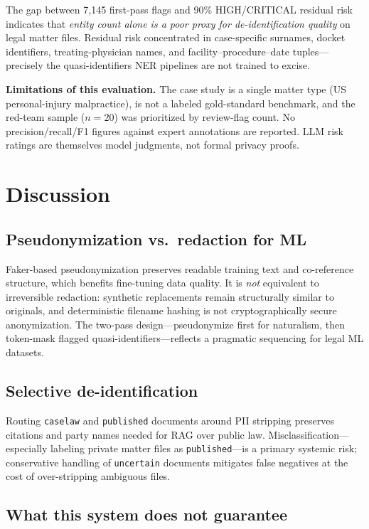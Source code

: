 \documentclass[11pt,a4paper]{article}
\begin{document}
The gap between 7{,}145 first-pass flags and 90\% HIGH/CRITICAL residual risk indicates that \emph{entity count alone is a poor proxy for de-identification quality} on legal matter files. Residual risk concentrated in case-specific surnames, docket identifiers, treating-physician names, and facility--procedure--date tuples---precisely the quasi-identifiers NER pipelines are not trained to excise.

\textbf{Limitations of this evaluation.} The case study is a single matter type (US personal-injury malpractice), is not a labeled gold-standard benchmark, and the red-team sample ($n=20$) was prioritized by review-flag count. No precision/recall/F1 figures against expert annotations are reported. LLM risk ratings are themselves model judgments, not formal privacy proofs.

\section{Discussion}

\subsection{Pseudonymization vs.\ redaction for ML}

Faker-based pseudonymization preserves readable training text and co-reference structure, which benefits fine-tuning data quality. It is \emph{not} equivalent to irreversible redaction: synthetic replacements remain structurally similar to originals, and deterministic filename hashing is not cryptographically secure anonymization. The two-pass design---pseudonymize first for naturalism, then token-mask flagged quasi-identifiers---reflects a pragmatic sequencing for legal ML datasets.

\subsection{Selective de-identification}

Routing \texttt{caselaw} and \texttt{published} documents around PII stripping preserves citations and party names needed for RAG over public law. Misclassification---especially labeling private matter files as \texttt{published}---is a primary systemic risk; conservative handling of \texttt{uncertain} documents mitigates false negatives at the cost of over-stripping ambiguous files.

\subsection{What this system does not guarantee}
\end{document}
